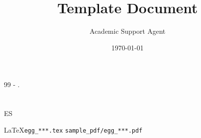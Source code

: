 \documentclass{article}
\title{Template Document}
\author{Academic Support Agent}
\date{\today}
\begin{document}
\maketitle


\section{ }

\JSPSInstructions	%

	  

	 

	\vspace{1cm}
	\begin{thebibliography}{99}
		   -  .
	\end{thebibliography}



\section{ }

		 

	 
	 
	 
	 




\section{ }

	 ES 

	\LaTeX  \texttt{egg\_***.tex}  \texttt{sample\_pdf/egg\_***.pdf} 



\end{document}
